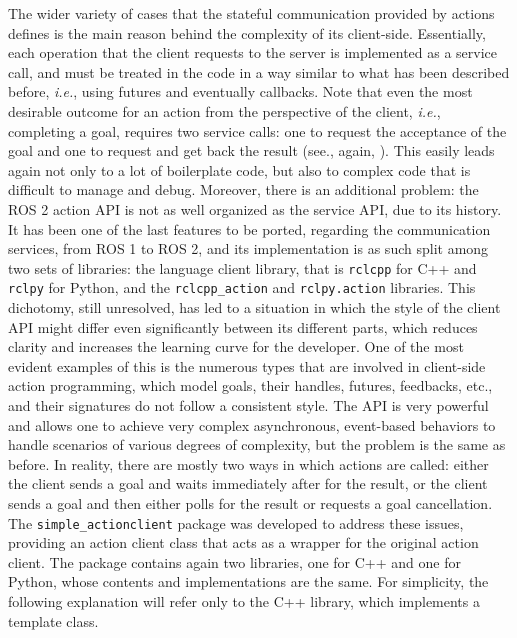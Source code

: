 The wider variety of cases that the stateful communication provided by actions defines is the main reason behind the complexity of its client-side. Essentially, each operation that the client requests to the server is implemented as a service call, and must be treated in the code in a way similar to what has been described before, \emph{i.e.}, using futures and eventually callbacks. Note that even the most desirable outcome for an action from the perspective of the client, \emph{i.e.}, completing a goal, requires two service calls: one to request the acceptance of the goal and one to request and get back the result (see., again, ). This easily leads again not only to a lot of boilerplate code, but also to complex code that is difficult to manage and debug. Moreover, there is an additional problem: the ROS 2 action API is not as well organized as the service API, due to its history. It has been one of the last features to be ported, regarding the communication services, from ROS 1 to ROS 2, and its implementation is as such split among two sets of libraries: the language client library, that is \texttt{rclcpp} for C++ and \texttt{rclpy} for Python, and the \texttt{rclcpp\_action} and \texttt{rclpy.action} libraries. This dichotomy, still unresolved, has led to a situation in which the style of the client API might differ even significantly between its different parts, which reduces clarity and increases the learning curve for the developer. One of the most evident examples of this is the numerous types that are involved in client-side action programming, which model goals, their handles, futures, feedbacks, etc., and their signatures do not follow a consistent style. The API is very powerful and allows one to achieve very complex asynchronous, event-based behaviors to handle scenarios of various degrees of complexity, but the problem is the same as before. In reality, there are mostly two ways in which actions are called: either the client sends a goal and waits immediately after for the result, or the client sends a goal and then either polls for the result or requests a goal cancellation. The \texttt{simple\_actionclient} package \cite{masocco_simple_actionclient_nodate} was developed to address these issues, providing an action client class that acts as a wrapper for the original action client. The package contains again two libraries, one for C++ and one for Python, whose contents and implementations are the same. For simplicity, the following explanation will refer only to the C++ library, which implements a template class.

